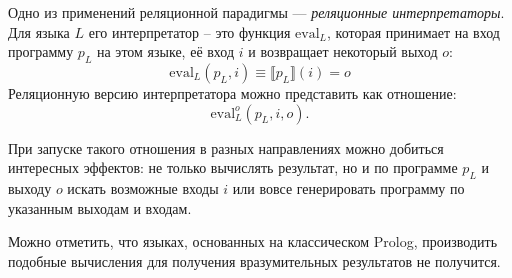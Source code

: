 Одно из применений реляционной парадигмы --- {\it реляционные интерпретаторы}.
Для языка $L$ его интерпретатор -- это функция $\text{eval}_L$, которая принимает
на вход программу $p_L$ на этом языке, её вход $i$ и возвращает некоторый выход $o$:
\[ \text{eval}_L (p_L, i) \equiv \llbracket p_L \rrbracket (i) = o \]
Реляционную версию интерпретатора можно представить как отношение:
\[ \text{eval}_L^o(p_L, i, o). \]

При запуске такого отношения в разных направлениях можно добиться интересных
эффектов: не только вычислять результат, но и по программе $p_L$ и выходу $o$
искать возможные входы $i$ или вовсе генерировать программу по указанным
выходам и входам.

Можно отметить, что языках, основанных на классическом Prolog, производить
подобные вычисления для получения вразумительных результатов не получится. 
